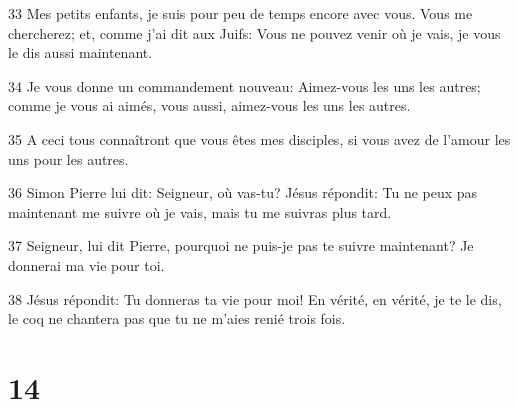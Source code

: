\par 33 Mes petits enfants, je suis pour peu de temps encore avec vous. Vous me chercherez; et, comme j'ai dit aux Juifs: Vous ne pouvez venir où je vais, je vous le dis aussi maintenant.
\par 34 Je vous donne un commandement nouveau: Aimez-vous les uns les autres; comme je vous ai aimés, vous aussi, aimez-vous les uns les autres.
\par 35 A ceci tous connaîtront que vous êtes mes disciples, si vous avez de l'amour les uns pour les autres.
\par 36 Simon Pierre lui dit: Seigneur, où vas-tu? Jésus répondit: Tu ne peux pas maintenant me suivre où je vais, mais tu me suivras plus tard.
\par 37 Seigneur, lui dit Pierre, pourquoi ne puis-je pas te suivre maintenant? Je donnerai ma vie pour toi.
\par 38 Jésus répondit: Tu donneras ta vie pour moi! En vérité, en vérité, je te le dis, le coq ne chantera pas que tu ne m'aies renié trois fois.

\chapter{14}

